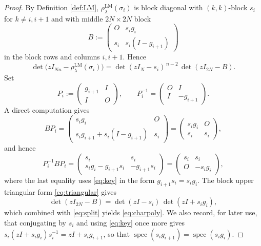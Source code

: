 \documentclass[11pt]{article}
\theoremstyle{definition}
\theoremstyle{remark}
\newcommand{\spec}{\operatorname{spec}}
\newcommand{\rLMl}{\rho^{\mathrm{LM}}_{\lambda}}
\begin{document}
\begin{proof}
By Definition \ref{def:LM}, $\rLMl(\sigma_i)$ is block diagonal with
$(k,k)$-block $s_i$ for $k \neq i, i+1$ and with middle
$2N \times 2N$ block
\[
B :=
\begin{pmatrix}
O & s_i g_i \\ s_i & s_i(I - g_{i+1})
\end{pmatrix}
\]
in the block rows and columns $i, i+1$. Hence
\begin{equation}\label{eq:split}
\det\bigl(z I_{Nn} - \rLMl(\sigma_i)\bigr)
= \det(z I_N - s_i)^{\,n-2}\,\det(z I_{2N} - B).
\end{equation}
Set
\[
P_i :=
\begin{pmatrix}
g_{i+1} & I \\ I & O
\end{pmatrix},
\qquad
P_i^{-1} =
\begin{pmatrix}
O & I \\ I & -g_{i+1}
\end{pmatrix}.
\]
A direct computation gives
\[
B P_i =
\begin{pmatrix}
s_i g_i & O \\ s_i g_{i+1} + s_i(I - g_{i+1}) & s_i
\end{pmatrix}
=
\begin{pmatrix}
s_i g_i & O \\ s_i & s_i
\end{pmatrix},
\]
and hence
\begin{equation}\label{eq:triangular}
P_i^{-1} B P_i =
\begin{pmatrix}
s_i & s_i \\ s_i g_i - g_{i+1} s_i & -g_{i+1} s_i
\end{pmatrix}
=
\begin{pmatrix}
s_i & s_i \\ O & -s_i g_i
\end{pmatrix},
\end{equation}
where the last equality uses \eqref{eq:key} in the form
$g_{i+1} s_i = s_i g_i$. The block upper triangular form
\eqref{eq:triangular} gives
\[
\det(z I_{2N} - B) = \det(z I - s_i)\,\det(z I + s_i g_i),
\]
which combined with \eqref{eq:split} yields \eqref{eq:charpoly}. We also
record, for later use, that conjugating by $s_i$ and using
\eqref{eq:key} once more gives
$s_i(z I + s_i g_i)s_i^{-1} = z I + s_i g_{i+1}$, so that
$\spec(s_i g_{i+1}) = \spec(s_i g_i)$.
\end{proof}
\end{document}
